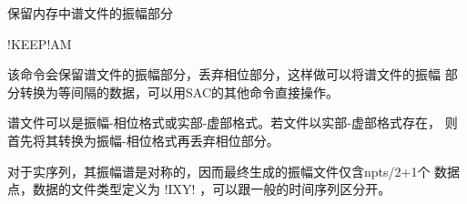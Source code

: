 \label{cmd:keepam}

保留内存中谱文件的振幅部分

\begin{SACSTX}
!KEEP!AM
\end{SACSTX}

该命令会保留谱文件的振幅部分，丢弃相位部分，这样做可以将谱文件的振幅
部分转换为等间隔的数据，可以用SAC的其他命令直接操作。

谱文件可以是振幅-相位格式或实部-虚部格式。若文件以实部-虚部格式存在，
则首先将其转换为振幅-相位格式再丢弃相位部分。

对于实序列，其振幅谱是对称的，因而最终生成的振幅文件仅含npts/2+1个
数据点，数据的文件类型定义为 !IXY! ，可以跟一般的时间序列区分开。
